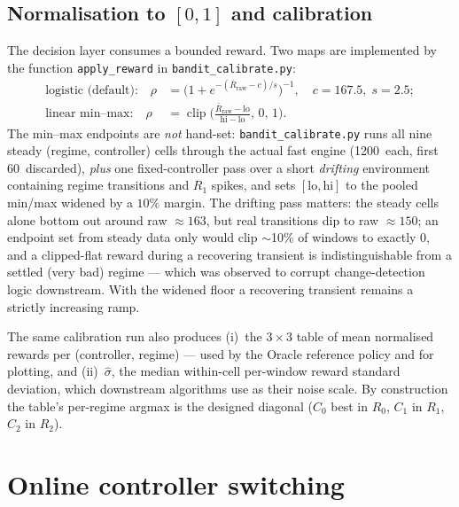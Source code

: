 \documentclass[11pt,a4paper]{article}
\newcommand{\SI}[2]{#1\,\text{#2}}
\newcommand{\code}[1]{\texttt{#1}}
\begin{document}
\subsection{Normalisation to $[0,1]$ and calibration}
\label{sec:calib}

The decision layer consumes a bounded reward. Two maps are implemented by the
function \code{apply\_reward} in \code{bandit\_calibrate.py}:
\begin{align}
  \text{logistic (default):}\quad
  \rho &= \Big(1 + e^{-(\bar R_{\mathrm{raw}} - c)/s}\Big)^{-1},
  \quad c = 167.5,\; s = 2.5;\\[2pt]
  \text{linear min--max:}\quad
  \rho &= \operatorname{clip}\!\Big( \tfrac{\bar R_{\mathrm{raw}} - \mathrm{lo}}
        {\mathrm{hi} - \mathrm{lo}},\, 0,\, 1 \Big).
\end{align}
The min--max endpoints are \emph{not} hand-set: \code{bandit\_calibrate.py} runs all nine
steady (regime, controller) cells through the actual fast engine
(\SI{1200}{s} each, first \SI{60}{s} discarded), \emph{plus} one fixed-controller pass
over a short \emph{drifting} environment containing regime transitions and $R_1$ spikes,
and sets $[\mathrm{lo},\mathrm{hi}]$ to the pooled min/max widened by a $10\%$ margin.
The drifting pass matters: the steady cells alone bottom out around raw $\approx 163$,
but real transitions dip to raw $\approx 150$; an endpoint set from steady data only
would clip $\sim$10\% of windows to exactly $0$, and a clipped-flat reward during a
recovering transient is indistinguishable from a settled (very bad) regime --- which was
observed to corrupt change-detection logic downstream. With the widened floor a
recovering transient remains a strictly increasing ramp.

The same calibration run also produces (i)~the $3\times3$ table of mean normalised
rewards per (controller, regime) --- used by the Oracle reference policy and for
plotting, and (ii)~$\hat\sigma$, the median within-cell per-window reward standard
deviation, which downstream algorithms use as their noise scale. By construction the
table's per-regime argmax is the designed diagonal ($C_0$ best in $R_0$, $C_1$ in $R_1$,
$C_2$ in $R_2$).

\section{Online controller switching}
\label{sec:switch}
\end{document}
